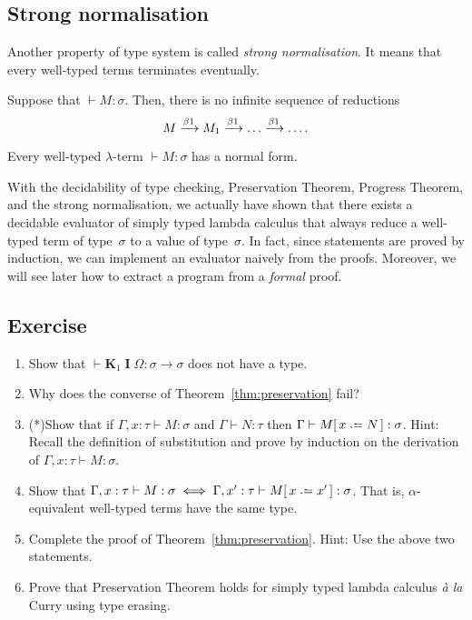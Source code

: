\subsection{Strong normalisation}
Another property of type system is called \emph{strong normalisation}. It means
that every well-typed terms terminates eventually. 
\begin{theorem}
  Suppose that ${}\vdash M : \sigma$. Then,
  there is no infinite sequence of reductions
  \[
    M \xrightarrow{\beta1} M_1 \xrightarrow{\beta1} \dots \xrightarrow{\beta1} \dots.
  \]
\end{theorem}
\begin{corollary}
  Every well-typed $\lambda$-term ${}\vdash M:\sigma$ has a normal form.
\end{corollary}
With the decidability of type checking, Preservation Theorem, Progress Theorem,
and the strong normalisation, we actually have shown that there exists a
decidable evaluator of simply typed lambda calculus that always reduce a
well-typed term of type~$\sigma$ to a value of type~$\sigma$. In fact, since
statements are proved by induction, we can implement an evaluator naively from
the proofs. Moreover, we will see later how to extract a program from a
\emph{formal} proof.
\subsection*{Exercise}
\begin{enumerate}
  \item Show that $\vdash \mathbf{K}_1\;\mathbf{I}\;\Omega : \sigma \to \sigma$
    does not have a type.
  \item Why does the converse of Theorem~\ref{thm:preservation} fail?
  \item (*)Show that if $\Gamma, x : \tau \vdash M : \sigma$
    and $\Gamma \vdash N : \tau$ then $\Gamma \vdash M\subst{x}{N} : \sigma$.
    Hint: Recall the definition of substitution and prove by induction
    on the derivation of $\Gamma, x:\tau\vdash M : \sigma$.
  \item Show that $\Gamma, x : \tau \vdash M :\sigma
    \iff \Gamma, x' : \tau \vdash M\subst{x}{x'} : \sigma$. That is,
    $\alpha$-equivalent well-typed terms have the same type.
  \item Complete the proof of Theorem~\ref{thm:preservation}. Hint: Use the
    above two statements.
  \item Prove that Preservation Theorem holds for simply typed lambda calculus
    \textit{\`a la} Curry using type erasing.
\end{enumerate}
